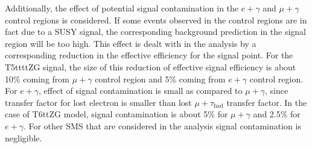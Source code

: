 Additionally, the effect of potential signal contamination in the $e+\gamma$ and $\mu+\gamma$ control regions is considered. 
If some events observed in the control regions are in fact due to a SUSY signal, the corresponding
background prediction in the signal region will be too high. This effect is dealt with in the
analysis by a corresponding reduction in the effective efficiency for the signal point. For the
T5ttttZG signal, the size of this reduction of effective signal efficiency is about 10\% coming from $\mu+\gamma$ control region and 5\% coming from $e+\gamma$ control region. For $e+\gamma$, effect of signal contamination is small as compared to $\mu+\gamma$, since transfer factor for lost electron is smaller than lost $\mu+\tau_{\text{had}}$ transfer factor. In the case of T6ttZG model, signal contamination is about 5\% for $\mu+\gamma$ and 2.5\% for $e+\gamma$. For other SMS that are considered in the analysis signal contamination is negligible.
